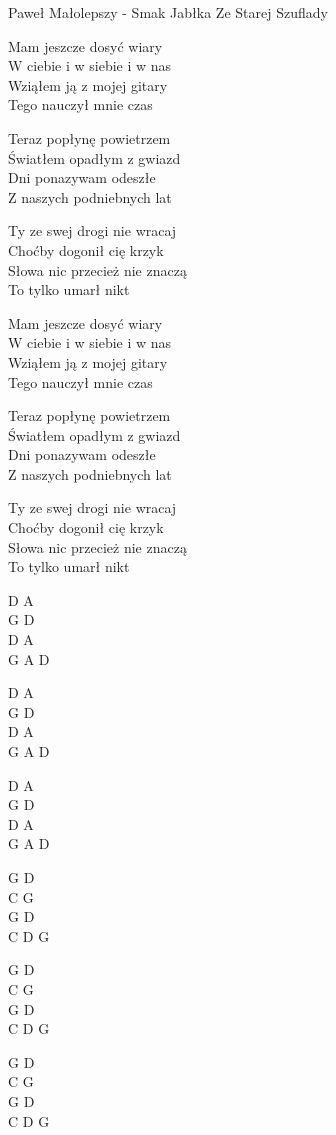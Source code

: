 {Paweł Małolepszy - Smak Jabłka}
{Ze Starej Szuflady}
\begin{text}
Mam jeszcze dosyć wiary\\
W ciebie i w siebie i w nas\\
Wziąłem ją z mojej gitary\\
Tego nauczył mnie czas

Teraz popłynę powietrzem\\
Światłem opadłym z gwiazd\\
Dni ponazywam odeszłe\\
Z naszych podniebnych lat

Ty ze swej drogi nie wracaj\\
Choćby dogonił cię krzyk\\
Słowa nic przecież nie znaczą\\
To tylko umarł nikt

Mam jeszcze dosyć wiary\\
W ciebie i w siebie i w nas\\
Wziąłem ją z mojej gitary\\
Tego nauczył mnie czas

Teraz popłynę powietrzem\\
Światłem opadłym z gwiazd\\
Dni ponazywam odeszłe\\
Z naszych podniebnych lat

Ty ze swej drogi nie wracaj\\
Choćby dogonił cię krzyk\\
Słowa nic przecież nie znaczą\\
To tylko umarł nikt
\end{text}
\begin{chord}
D A\\
G D\\
D A\\
G A D

D A\\
G D\\
D A\\
G A D

D A\\
G D\\
D A\\
G A D

G D\\
C G\\
G D\\
C D G

G D\\
C G\\
G D\\
C D G

G D\\
C G\\
G D\\
C D G
\end{chord}